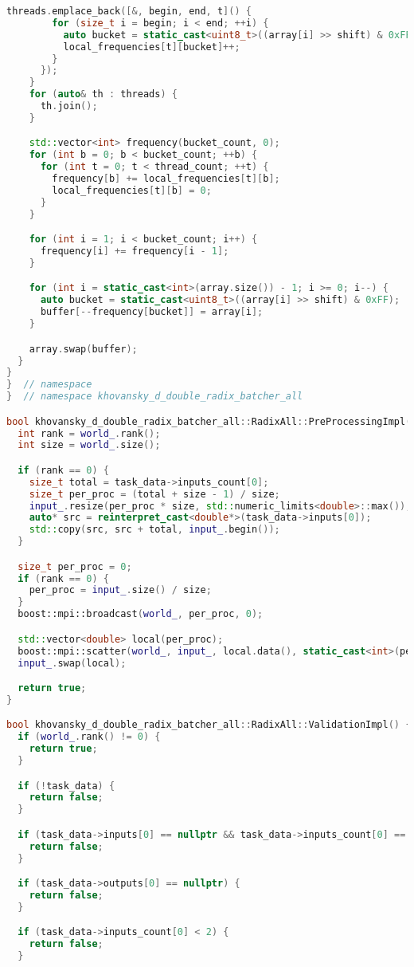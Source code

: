 \documentclass[12pt]{article}
\begin{document}
\begin{lstlisting}[language=C++,
    breaklines=true,       % Автоматический перенос строк
    columns=fullflexible ]
      threads.emplace_back([&, begin, end, t]() {
        for (size_t i = begin; i < end; ++i) {
          auto bucket = static_cast<uint8_t>((array[i] >> shift) & 0xFF);
          local_frequencies[t][bucket]++;
        }
      });
    }
    for (auto& th : threads) {
      th.join();
    }

    std::vector<int> frequency(bucket_count, 0);
    for (int b = 0; b < bucket_count; ++b) {
      for (int t = 0; t < thread_count; ++t) {
        frequency[b] += local_frequencies[t][b];
        local_frequencies[t][b] = 0;
      }
    }

    for (int i = 1; i < bucket_count; i++) {
      frequency[i] += frequency[i - 1];
    }

    for (int i = static_cast<int>(array.size()) - 1; i >= 0; i--) {
      auto bucket = static_cast<uint8_t>((array[i] >> shift) & 0xFF);
      buffer[--frequency[bucket]] = array[i];
    }

    array.swap(buffer);
  }
}
}  // namespace
}  // namespace khovansky_d_double_radix_batcher_all

bool khovansky_d_double_radix_batcher_all::RadixAll::PreProcessingImpl() {
  int rank = world_.rank();
  int size = world_.size();

  if (rank == 0) {
    size_t total = task_data->inputs_count[0];
    size_t per_proc = (total + size - 1) / size;
    input_.resize(per_proc * size, std::numeric_limits<double>::max());
    auto* src = reinterpret_cast<double*>(task_data->inputs[0]);
    std::copy(src, src + total, input_.begin());
  }

  size_t per_proc = 0;
  if (rank == 0) {
    per_proc = input_.size() / size;
  }
  boost::mpi::broadcast(world_, per_proc, 0);

  std::vector<double> local(per_proc);
  boost::mpi::scatter(world_, input_, local.data(), static_cast<int>(per_proc), 0);
  input_.swap(local);

  return true;
}

bool khovansky_d_double_radix_batcher_all::RadixAll::ValidationImpl() {
  if (world_.rank() != 0) {
    return true;
  }

  if (!task_data) {
    return false;
  }

  if (task_data->inputs[0] == nullptr && task_data->inputs_count[0] == 0) {
    return false;
  }

  if (task_data->outputs[0] == nullptr) {
    return false;
  }

  if (task_data->inputs_count[0] < 2) {
    return false;
  }


\end{lstlisting}
\end{document}
